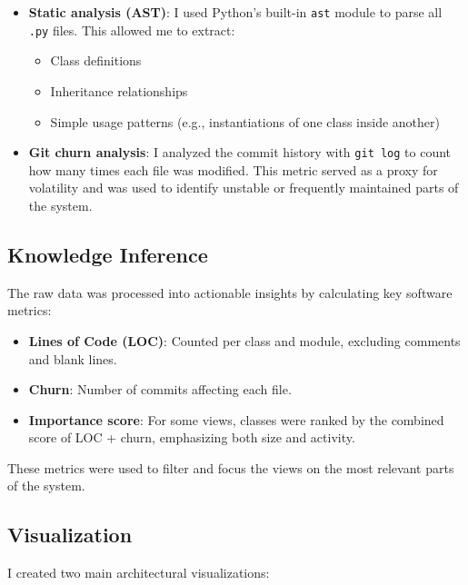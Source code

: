 \begin{itemize}
  \item \textbf{Static analysis (AST)}: I used Python’s built-in \texttt{ast} module to parse all \texttt{.py} files. This allowed me to extract:
  \begin{itemize}
    \item Class definitions
    \item Inheritance relationships
    \item Simple usage patterns (e.g., instantiations of one class inside another)
  \end{itemize}
  
  \item \textbf{Git churn analysis}: I analyzed the commit history with \texttt{git log} to count how many times each file was modified. This metric served as a proxy for volatility and was used to identify unstable or frequently maintained parts of the system.
\end{itemize}

\subsection{Knowledge Inference}

The raw data was processed into actionable insights by calculating key software metrics:

\begin{itemize}
  \item \textbf{Lines of Code (LOC)}: Counted per class and module, excluding comments and blank lines.
  \item \textbf{Churn}: Number of commits affecting each file.
  \item \textbf{Importance score}: For some views, classes were ranked by the combined score of LOC + churn, emphasizing both size and activity.
\end{itemize}

These metrics were used to filter and focus the views on the most relevant parts of the system.

\subsection{Visualization}

I created two main architectural visualizations:

